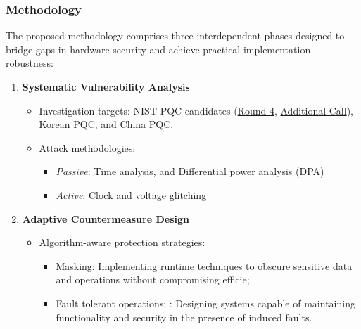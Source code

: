 \documentclass[11pt, a4paper]{article}
\begin{document}
\subsubsection*{Methodology}

The proposed methodology comprises three 
interdependent phases designed to bridge gaps 
in hardware security and achieve practical implementation robustness:


\begin{enumerate}[leftmargin=*, label=\textbf{\arabic*.}, series=main]
    \item \textbf{Systematic Vulnerability Analysis}
    \begin{itemize}[leftmargin=2em]
        \item Investigation targets: NIST PQC candidates (\href{https://csrc.nist.gov/projects/post-quantum-cryptography/round-4-submissions}{Round 4}, \href{https://csrc.nist.gov/projects/pqc-dig-sig/round-2-additional-signatures}{Additional Call}), 
        \href{https://www.kpqc.or.kr/competition.html}{Korean PQC}, and \href{https://niccs.org.cn/en/notice/}{China PQC}.
        \item Attack methodologies:
        \begin{itemize}
            \item \textit{Passive}: Time analysis, and Differential power analysis (DPA)
            \item \textit{Active}: Clock and voltage glitching
        \end{itemize}
    \end{itemize}
    
    \item \textbf{Adaptive Countermeasure Design}
    \begin{itemize}[leftmargin=2em]
        \item Algorithm-aware protection strategies:
        \begin{itemize}
            \item Masking: Implementing runtime techniques to obscure sensitive data and operations without compromising efficie;
            \item Fault tolerant operations: : Designing systems capable of maintaining functionality and security in the presence of induced faults.
        \end{itemize}
    \end{itemize}
    

\end{enumerate}
\end{document}
